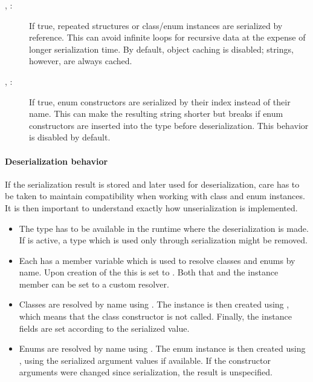 \begin{description}
	\item[, :] If true, repeated structures or class\slash enum instances are serialized by reference. This can avoid infinite loops for recursive data at the expense of longer serialization time. By default, object caching is disabled; strings, however, are always cached.
	\item[, :] If true, enum constructors are serialized by their index instead of their name. This can make the resulting string shorter but breaks if enum constructors are inserted into the type before deserialization. This behavior is disabled by default.
\end{description}

\paragraph{Deserialization behavior}

If the serialization result is stored and later used for deserialization, care has to be taken to maintain compatibility when working with class and enum instances. It is then important to understand exactly how unserialization is implemented.

\begin{itemize}
	\item The type has to be available in the runtime where the deserialization is made. If  is active, a type which is used only through serialization might be removed.
	\item Each  has a member variable  which is used to resolve classes and enums by name. Upon creation of the  this is set to . Both that and the instance member can be set to a custom resolver.
	\item Classes are resolved by name using . The instance is then created using , which means that the class constructor is not called. Finally, the instance fields are set according to the serialized value.
	\item Enums are resolved by name using . The enum instance is then created using , using the serialized argument values if available. If the constructor arguments were changed since serialization, the result is unspecified.
\end{itemize}


